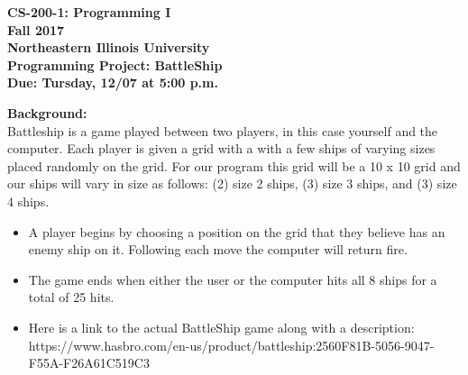 \documentclass[12pt]{article}
\begin{document}
\begin{center}
	\textbf{CS-200-1: Programming I}\\
	\textbf{Fall 2017}\\
	\textbf{Northeastern Illinois University}\\
	\textbf{Programming Project: BattleShip}\\
	\textbf{Due: Tursday, 12/07 at 5:00 p.m.}
\end{center}

\vspace*{0.5cm}
\noindent\textbf{Background:}\\
Battleship is a game played between two players, in this case yourself and the computer. Each player is given a grid with a with a few ships of varying sizes placed randomly on the grid. For our program this grid will be a 10 x 10 grid and our ships will vary in size as follows: (2) size 2 ships, (3) size 3 ships, and (3) size 4 ships. 



\begin{itemize}
	\item 	A player begins by choosing a position on the grid that they believe has an enemy ship on it. Following each move the computer will return fire.  
	\item The game ends when either the user or the computer hits all 8 ships for a total of 25 hits. 
	\item Here is a link to the actual BattleShip game along with a description: https://www.hasbro.com/en-us/product/battleship:2560F81B-5056-9047-F55A-F26A61C519C3
	
\end{itemize}
\end{document}
